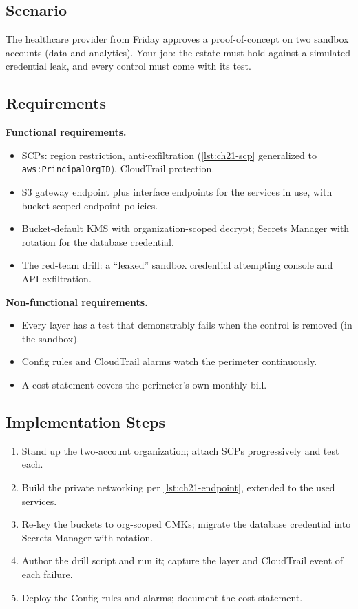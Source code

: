 \subsection*{Scenario}
The healthcare provider from Friday approves a proof-of-concept on two sandbox accounts (data and analytics). Your job: the estate must hold against a simulated credential leak, and every control must come with its test.

\subsection*{Requirements}
\textbf{Functional requirements.}
\begin{itemize}
    \item SCPs: region restriction, anti-exfiltration (\cref{lst:ch21-scp} generalized to \texttt{aws:PrincipalOrgID}), CloudTrail protection.
    \item S3 gateway endpoint plus interface endpoints for the services in use, with bucket-scoped endpoint policies.
    \item Bucket-default KMS with organization-scoped decrypt; Secrets Manager with rotation for the database credential.
    \item The red-team drill: a ``leaked'' sandbox credential attempting console and API exfiltration.
\end{itemize}

\textbf{Non-functional requirements.}
\begin{itemize}
    \item Every layer has a test that demonstrably fails when the control is removed (in the sandbox).
    \item Config rules and CloudTrail alarms watch the perimeter continuously.
    \item A cost statement covers the perimeter's own monthly bill.
\end{itemize}

\subsection*{Implementation Steps}
\begin{enumerate}
    \item Stand up the two-account organization; attach SCPs progressively and test each.
    \item Build the private networking per \cref{lst:ch21-endpoint}, extended to the used services.
    \item Re-key the buckets to org-scoped CMKs; migrate the database credential into Secrets Manager with rotation.
    \item Author the drill script and run it; capture the layer and CloudTrail event of each failure.
    \item Deploy the Config rules and alarms; document the cost statement.
\end{enumerate}

